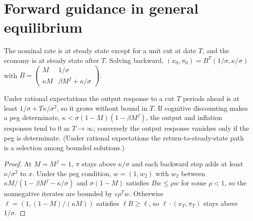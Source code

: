 \section{Forward guidance in general equilibrium}

\begin{definition}
\label{def:bm-fgge}
\leanok
The nominal rate is at steady state except for a unit cut at date $T$, and the economy is at steady state after $T$.
Solving backward, $(x_0,\pi_0)=B^T(1/\sigma,\kappa/\sigma)$ with $B=\begin{pmatrix}M&1/\sigma\\ \kappa M&\beta M^f+\kappa/\sigma\end{pmatrix}$.
\end{definition}

\begin{theorem}
\label{thm:bm-fgge}
\leanok
Under rational expectations the output response to a cut $T$ periods ahead is at least $1/\sigma+T\kappa/\sigma^2$, so
it grows without bound in $T$. If cognitive discounting makes a peg determinate, $\kappa<\sigma(1-M)(1-\beta M^f)$,
the output and inflation responses tend to $0$ as $T\to\infty$; conversely the output response vanishes only if the
peg is determinate. (Under rational expectations the return-to-steady-state path is a selection among bounded solutions.)
\end{theorem}
\begin{proof}
\leanok
At $M=M^f=1$, $\pi$ stays above $\kappa/\sigma$ and each backward step adds at least $\kappa/\sigma^2$ to $x$.
Under the peg condition, $w=(1,w_2)$ with $w_2$ between $\kappa M/(1-\beta M^f-\kappa/\sigma)$ and $\sigma(1-M)$ satisfies
$Bw\le\rho w$ for some $\rho<1$, so the nonnegative iterates are bounded by $c\rho^T w$. Otherwise
$\ell=(1,(1-M)/(\kappa M))$ satisfies $\ell B\ge\ell$, so $\ell\cdot(x_T,\pi_T)$ stays above $1/\sigma$.
\end{proof}

